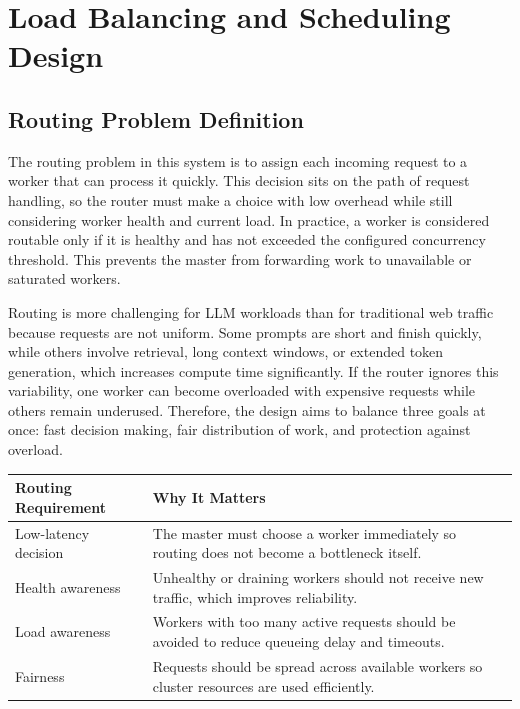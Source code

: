 \section{Load Balancing and Scheduling Design}

\subsection{Routing Problem Definition}
The routing problem in this system is to assign each incoming request to a worker that can process it quickly. This decision sits on the path of request handling, so the router must make a choice with low overhead while still considering worker health and current load. In practice, a worker is considered routable only if it is healthy and has not exceeded the configured concurrency threshold. This prevents the master from forwarding work to unavailable or saturated workers.

Routing is more challenging for LLM workloads than for traditional web traffic because requests are not uniform. Some prompts are short and finish quickly, while others involve retrieval, long context windows, or extended token generation, which increases compute time significantly. If the router ignores this variability, one worker can become overloaded with expensive requests while others remain underused. Therefore, the design aims to balance three goals at once: fast decision making, fair distribution of work, and protection against overload.

\begin{table}[H]
  \centering
  \renewcommand{\arraystretch}{1.2}
  \begin{tabularx}{\textwidth}{@{}lX@{}}
    \toprule
    \textbf{Routing Requirement} & \textbf{Why It Matters} \\
    \midrule
    Low-latency decision & The master must choose a worker immediately so routing does not become a bottleneck itself. \\
    Health awareness & Unhealthy or draining workers should not receive new traffic, which improves reliability. \\
    Load awareness & Workers with too many active requests should be avoided to reduce queueing delay and timeouts. \\
    Fairness & Requests should be spread across available workers so cluster resources are used efficiently. \\
    \bottomrule
  \end{tabularx}
\end{table}

